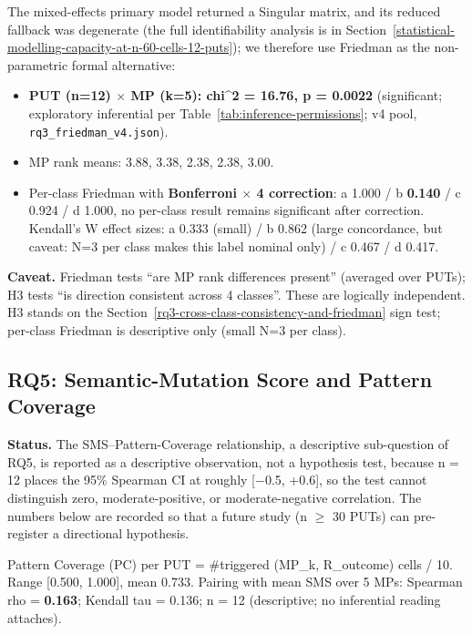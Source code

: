 \documentclass[manuscript,screen,review]{acmart}
\begin{document}
The mixed-effects primary model returned a Singular matrix, and its
reduced fallback was degenerate (the full identifiability analysis is in
Section~\ref{statistical-modelling-capacity-at-n-60-cells-12-puts}); we
therefore use Friedman as the non-parametric formal alternative:

\begin{itemize}

\item
  \textbf{PUT (n=12) $\times$ MP (k=5): chi\^{}2 = 16.76, p = 0.0022}
  (significant; exploratory inferential per Table~\ref{tab:inference-permissions};
  v4 pool, \texttt{rq3\_friedman\_v4.json}).
\item
  MP rank means: 3.88, 3.38, 2.38, 2.38, 3.00.
\item
  Per-class Friedman with \textbf{Bonferroni $\times$ 4 correction}: a
  1.000 / b \textbf{0.140} / c 0.924 / d 1.000, no per-class
  result remains significant after correction. Kendall's W effect sizes:
  a 0.333 (small) / b 0.862 (large concordance, but caveat: N=3 per
  class makes this label nominal only) / c 0.467 / d 0.417.
\end{itemize}

\textbf{Caveat.} Friedman tests ``are MP rank differences present''
(averaged over PUTs); H3 tests ``is direction consistent across 4
classes''. These are logically independent. H3 stands on the Section~\ref{rq3-cross-class-consistency-and-friedman} sign
test; per-class Friedman is descriptive only (small N=3 per class).

\subsection{RQ5: Semantic-Mutation Score and Pattern Coverage}\label{rq4-sms-vs-pattern-coverage}

\textbf{Status.} The SMS--Pattern-Coverage relationship, a descriptive
sub-question of RQ5, is reported as a descriptive observation, not a
hypothesis test, because n = 12 places the 95\% Spearman CI at roughly
{[}$-$0.5, +0.6{]}, so the test cannot distinguish zero,
moderate-positive, or moderate-negative correlation. The numbers below
are recorded so that a future study (n $\geq$ 30 PUTs) can pre-register a directional
hypothesis.

Pattern Coverage (PC) per PUT = \#triggered (MP\_k, R\_outcome) cells /
10. Range {[}0.500, 1.000{]}, mean 0.733. Pairing with mean SMS over 5
MPs: Spearman rho = \textbf{0.163}; Kendall tau = 0.136; n = 12
(descriptive; no inferential reading attaches).
\end{document}
